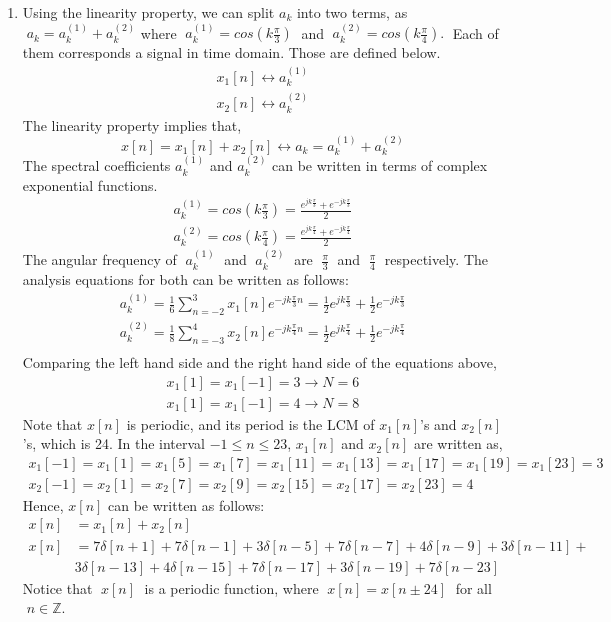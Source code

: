 \documentclass[10pt,a4paper, margin=1in]{article}
\begin{document}
\begin{enumerate}
\item %
Using the linearity property, we can split $a_k$ into two terms, as
$\; a_k = a_k^{(1)}+a_k^{(2)}$
where $\; a_k^{(1)} = cos(k\frac{\pi}{3}) \;$ and $\; a_k^{(2)} = cos(k\frac{\pi}{4}). \;$ Each of them corresponds a signal in time domain. Those are defined below.
    \begin{align*}
        x_1[n] \leftrightarrow a_k^{(1)} \\
        x_2[n] \leftrightarrow a_k^{(2)}
    \end{align*}
The linearity property implies that,
$$x[n] = x_1[n]+x_2[n] \leftrightarrow a_k = a_k^{(1)}+a_k^{(2)}$$
The spectral coefficients $a_k^{(1)}$ and $a_k^{(2)}$ can be written in terms of complex exponential functions.
    \begin{align*}
        a_k^{(1)} = cos(k\frac{\pi}{3}) = \frac{e^{jk\frac{\pi}{3}}+e^{-jk\frac{\pi}{3}}}{2} \\
        a_k^{(2)} = cos(k\frac{\pi}{4}) = \frac{e^{jk\frac{\pi}{4}}+e^{-jk\frac{\pi}{4}}}{2}
    \end{align*}
The angular frequency of $\; a_k^{(1)} \;$ and $\; a_k^{(2)} \;$ are $\; \frac{\pi}{3} \;$ and $\; \frac{\pi}{4} \;$ respectively. The analysis equations for both can be written as follows:
    \begin{align*}
        a_k^{(1)} = \frac{1}{6}\sum_{n=-2}^{3}x_1[n]e^{-jk\frac{\pi}{3}n} = \frac{1}{2}e^{jk\frac{\pi}{3}} + \frac{1}{2}e^{-jk\frac{\pi}{3}} \\
        a_k^{(2)} = \frac{1}{8}\sum_{n=-3}^{4}x_2[n]e^{-jk\frac{\pi}{4}n} = \frac{1}{2}e^{jk\frac{\pi}{4}} + \frac{1}{2}e^{-jk\frac{\pi}{4}} \\
    \end{align*}
Comparing the left hand side and the right hand side of the equations above,
\begin{align*}
    x_1[1] = x_1[-1] = 3 \rightarrow N=6 \\
    x_1[1] = x_1[-1] = 4 \rightarrow N=8 
\end{align*}
Note that $x[n]$ is periodic, and its period is the LCM of $x_1[n]$'s and $x_2[n]$'s, which is 24. In the interval $-1\leq n\leq 23$, $x_1[n]$ and $x_2[n]$ are written as,
    \begin{align*}
        x_1[-1] = x_1[1] = x_1[5] = x_1[7] = x_1[11] = x_1[13] = x_1[17] = x_1[19] = x_1[23] = 3\\
        x_2[-1] = x_2[1] = x_2[7] = x_2[9] = x_2[15] = x_2[17] = x_2[23] = 4
    \end{align*}
Hence, $x[n]$ can be written as follows:
    \begin{align*}
        x[n] &= x_1[n] + x_2[n] \\
        x[n] &= 7\delta[n+1]+7\delta[n-1]+3\delta[n-5]+7\delta[n-7]+4\delta[n-9]+3\delta[n-11]+\\
        &3\delta[n-13]+4\delta[n-15]+7\delta[n-17]+3\delta[n-19]+7\delta[n-23]
    \end{align*}
Notice that $\; x[n] \;$ is a periodic function, where $\; x[n]=x[n\pm 24] \;$ for all $\; n \in \mathbb{Z}.$\vspace{0.3cm}\\


\end{enumerate}
\end{document}
